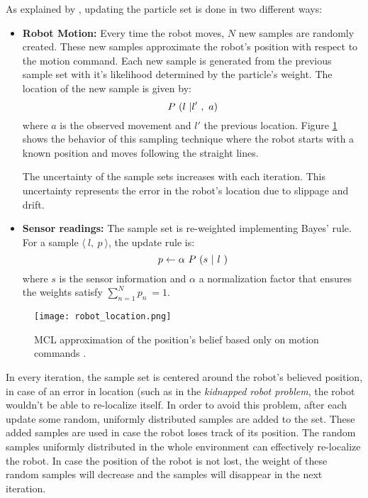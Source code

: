 As explained by \citet{Montecarlo}, updating the particle set is done in two different ways:
\begin{itemize}
	\item \textbf{Robot Motion:} Every time the robot moves, $N$ new samples are randomly created. These new samples approximate the robot's position with respect to the motion command. Each new sample is generated from the previous sample set with it's likelihood determined by the particle's weight. The location of the new sample is given by:
	\begin{equation}
	\vspace{-20pt}
		P\ (l\ \vert l'\ ,\ a)
	\end{equation}
	where $a$ is the observed movement and $l'$ the previous location. Figure \ref{fig:motion} shows the behavior of this sampling technique where the robot starts with a known position and moves following the straight lines.
	
	The uncertainty of the sample sets increases with each iteration. This uncertainty represents the error in the robot's location due to slippage and drift.
	\item \textbf{Sensor readings:} The sample set is re-weighted implementing Bayes' rule. For a sample $\langle\ l,\ p\ \rangle$, the update rule is:
	\begin{equation}
	\vspace{-20pt}
	p \leftarrow \alpha \ P\  (s \ |\ l \ )
	\end{equation}
	where $s$ is the sensor information and $\alpha$ a normalization factor that ensures the weights satisfy $\sum_{n=1}^{N} p_n\ = 1$.
\end{itemize}

\begin{figure}[H]
		\centering
		\texttt{[image: robot\_location.png]}
		\vspace{-10pt}
		\caption[Monte Carlo Loc. approximation]{MCL approximation of the position's belief based only on motion commands \citep[page 3]{Montecarlo}.}
		\vspace{-15pt}
		\label{fig:motion}
\end{figure}

In every iteration, the sample set is centered around the robot's believed position, in case of an error in location (such as in the \textit{kidnapped robot problem}, the robot wouldn't be able to re-localize itself. In order to avoid this problem, after each update some random, uniformly distributed samples are added to the set. These added samples are used in case the robot loses track of its position. The random samples uniformly distributed in the whole environment can effectively re-localize the robot. In case the position of the robot is not lost, the weight of these random samples will decrease and the samples will disappear in the next iteration.

